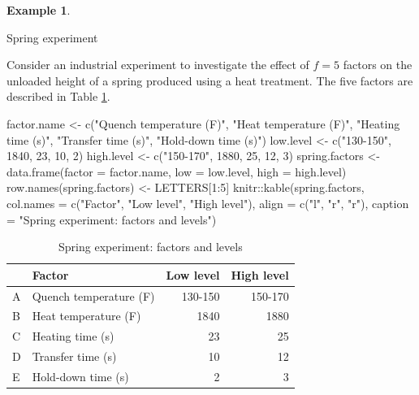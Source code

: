 \documentclass[
]{book}
\newenvironment{Shaded}{\begin{snugshade}}{\end{snugshade}}
\newcommand{\AttributeTok}[1]{\textcolor[rgb]{0.77,0.63,0.00}{#1}}
\newcommand{\DecValTok}[1]{\textcolor[rgb]{0.00,0.00,0.81}{#1}}
\newcommand{\FunctionTok}[1]{\textcolor[rgb]{0.00,0.00,0.00}{#1}}
\newcommand{\NormalTok}[1]{#1}
\newcommand{\OtherTok}[1]{\textcolor[rgb]{0.56,0.35,0.01}{#1}}
\newcommand{\SpecialCharTok}[1]{\textcolor[rgb]{0.00,0.00,0.00}{#1}}
\newcommand{\StringTok}[1]{\textcolor[rgb]{0.31,0.60,0.02}{#1}}
\theoremstyle{definition}
\theoremstyle{definition}
\newtheorem{example}{Example}[chapter]
\theoremstyle{definition}
\theoremstyle{definition}
\theoremstyle{remark}
\begin{document}
\begin{example}
\protect\hypertarget{exm:spring-experiment}{}\label{exm:spring-experiment}

Spring experiment \citep[ch.~5]{WH2009}

Consider an industrial experiment to investigate the effect of \(f=5\) factors on the unloaded height of a spring produced using a heat treatment. The five factors are described in Table \ref{tab:spring-factors}.

\begin{Shaded}
\begin{Highlighting}[]
\NormalTok{factor.name }\OtherTok{\textless{}{-}} \FunctionTok{c}\NormalTok{(}\StringTok{"Quench temperature (F)"}\NormalTok{, }\StringTok{"Heat temperature (F)"}\NormalTok{, }\StringTok{"Heating time (s)"}\NormalTok{, }
                 \StringTok{"Transfer time (s)"}\NormalTok{, }\StringTok{"Hold{-}down time (s)"}\NormalTok{)}
\NormalTok{low.level }\OtherTok{\textless{}{-}} \FunctionTok{c}\NormalTok{(}\StringTok{"130{-}150"}\NormalTok{, }\DecValTok{1840}\NormalTok{, }\DecValTok{23}\NormalTok{, }\DecValTok{10}\NormalTok{, }\DecValTok{2}\NormalTok{)}
\NormalTok{high.level }\OtherTok{\textless{}{-}} \FunctionTok{c}\NormalTok{(}\StringTok{"150{-}170"}\NormalTok{, }\DecValTok{1880}\NormalTok{, }\DecValTok{25}\NormalTok{, }\DecValTok{12}\NormalTok{, }\DecValTok{3}\NormalTok{)}
\NormalTok{spring.factors }\OtherTok{\textless{}{-}} \FunctionTok{data.frame}\NormalTok{(}\AttributeTok{factor =}\NormalTok{ factor.name, }\AttributeTok{low =}\NormalTok{ low.level, }\AttributeTok{high =}\NormalTok{ high.level)}
\FunctionTok{row.names}\NormalTok{(spring.factors) }\OtherTok{\textless{}{-}}\NormalTok{ LETTERS[}\DecValTok{1}\SpecialCharTok{:}\DecValTok{5}\NormalTok{]}
\NormalTok{knitr}\SpecialCharTok{::}\FunctionTok{kable}\NormalTok{(spring.factors, }\AttributeTok{col.names =} \FunctionTok{c}\NormalTok{(}\StringTok{"Factor"}\NormalTok{, }\StringTok{"Low level"}\NormalTok{, }\StringTok{"High level"}\NormalTok{), }
             \AttributeTok{align =} \FunctionTok{c}\NormalTok{(}\StringTok{"l"}\NormalTok{, }\StringTok{"r"}\NormalTok{, }\StringTok{"r"}\NormalTok{), }\AttributeTok{caption =} \StringTok{"Spring experiment: factors and levels"}\NormalTok{)}
\end{Highlighting}
\end{Shaded}

\begin{table}

\caption{\label{tab:spring-factors}Spring experiment: factors and levels}
\centering
\begin{tabular}[t]{l|l|r|r}
\hline
  & Factor & Low level & High level\\
\hline
A & Quench temperature (F) & 130-150 & 150-170\\
\hline
B & Heat temperature (F) & 1840 & 1880\\
\hline
C & Heating time (s) & 23 & 25\\
\hline
D & Transfer time (s) & 10 & 12\\
\hline
E & Hold-down time (s) & 2 & 3\\
\hline
\end{tabular}
\end{table}


\end{example}
\end{document}
